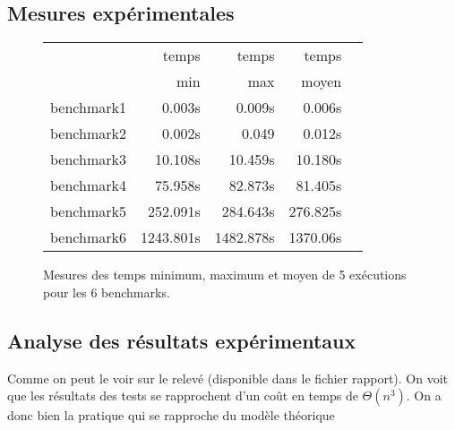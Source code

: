 \documentclass[a4paper, 10pt, french]{article}
\begin{document}
  \subsection{Mesures expérimentales}

    \begin{figure}[h]
      \begin{center}
        \begin{tabular}{|l||r||r|r|r||}
          \hline
          \hline
            & temps     & temps   & temps \\
            & min       & max     & moyen \\
          \hline
          \hline
            benchmark1      &  0.003s   & 0.009s    & 0.006s    \\
          \hline
            benchmark2       & 0.002s   & 0.049     & 0.012s     \\
          \hline
            benchmark3       & 10.108s  & 10.459s   & 10.180s    \\
          \hline
            benchmark4       & 75.958s     &  82.873s    & 81.405s    \\
          \hline
            benchmark5       & 252.091s    &  284.643s   & 276.825s     \\
          \hline
            benchmark6       & 1243.801s   & 1482.878s   & 1370.06s     \\
          \hline
          \hline
        \end{tabular}
        \caption{Mesures des temps minimum, maximum et moyen de 5 exécutions pour les 6 benchmarks.}
        \label{table-temps}
      \end{center}
    \end{figure}

\subsection{Analyse des résultats expérimentaux}
Comme on peut le voir sur le relevé (disponible dans le fichier rapport). On voit que les résultats des tests se rapprochent d'un coût en temps de $\Theta(n^3)$. On a donc bien la pratique qui se rapproche du modèle théorique
\end{document}

